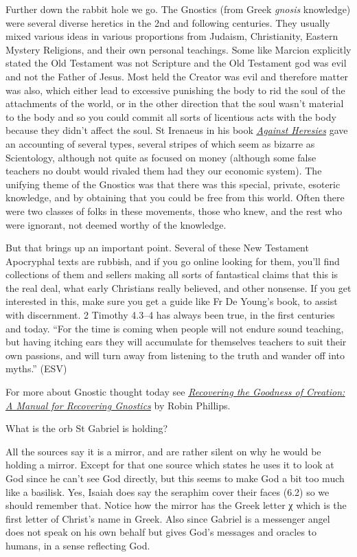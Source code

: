 \documentclass[
]{article}
\begin{document}
Further down the rabbit hole we go. The Gnostics (from Greek
\emph{gnosis} knowledge) were several diverse heretics in the 2nd and
following centuries. They usually mixed various ideas in various
proportions from Judaism, Christianity, Eastern Mystery Religions, and
their own personal teachings. Some like Marcion explicitly stated the
Old Testament was not Scripture and the Old Testament god was evil and
not the Father of Jesus. Most held the Creator was evil and therefore
matter was also, which either lead to excessive punishing the body to
rid the soul of the attachments of the world, or in the other direction
that the soul wasn't material to the body and so you could commit all
sorts of licentious acts with the body because they didn't affect the
soul. St Irenaeus in his book
\href{https://www.newadvent.org/fathers/0103.htm}{\emph{\ul{Against
Heresies}}} gave an accounting of several types, several stripes of
which seem as bizarre as Scientology, although not quite as focused on
money (although some false teachers no doubt would rivaled them had they
our economic system). The unifying theme of the Gnostics was that there
was this special, private, esoteric knowledge, and by obtaining that you
could be free from this world. Often there were two classes of folks in
these movements, those who knew, and the rest who were ignorant, not
deemed worthy of the knowledge.

But that brings up an important point. Several of these New Testament
Apocryphal texts are rubbish, and if you go online looking for them,
you'll find collections of them and sellers making all sorts of
fantastical claims that this is the real deal, what early Christians
really believed, and other nonsense. If you get interested in this, make
sure you get a guide like Fr De Young's book, to assist with
discernment. 2 Timothy 4.3--4 has always been true, in the first
centuries and today. ``For the time is coming when people will not
endure sound teaching, but having itching ears they will accumulate for
themselves teachers to suit their own passions, and will turn away from
listening to the truth and wander off into myths.'' (ESV)

For more about Gnostic thought today see
\emph{\href{https://store.ancientfaith.com/rediscovering-the-goodness-of-creation-a-manual-for-recovering-gnostics/}{\ul{Recovering
the Goodness of Creation: A Manual for Recovering Gnostics}}} by Robin
Phillips.

What is the orb St Gabriel is holding?

All the sources say it is a mirror, and are rather silent on why he
would be holding a mirror. Except for that one source which states he
uses it to look at God since he can't see God directly, but this seems
to make God a bit too much like a basilisk. Yes, Isaiah does say the
seraphim cover their faces (6.2) so we should remember that. Notice how
the mirror has the Greek letter χ which is the first letter of Christ's
name in Greek. Also since Gabriel is a messenger angel does not speak on
his own behalf but gives God's messages and oracles to humans, in a
sense reflecting God.
\end{document}
